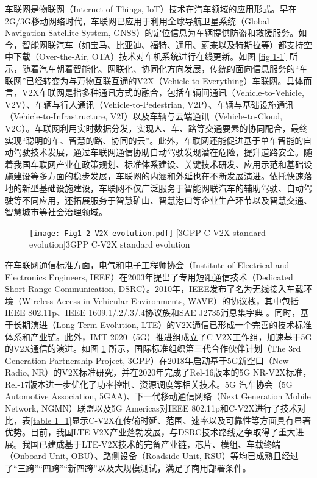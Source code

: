 车联网是物联网（Internet of Things, IoT）技术在汽车领域的应用形式。早在2G/3G移动网络时代，车联网已应用于利用全球导航卫星系统（Global Navigation Satellite System, GNSS）的定位信息为车辆提供防盗和救援服务。如今，智能网联汽车（如宝马、比亚迪、福特、通用、蔚来以及特斯拉等）都支持空中下载（Over-the-Air, OTA）技术对车机系统进行在线更新。如图 \ref{fig 1-1} 所示，随着汽车朝着智能化、网联化、协同化方向发展，传统的面向信息服务的“车联网”已经转变为与万物互联互通的V2X（Vehicle-to-Everything）车联网。具体而言，V2X车联网是指多种通讯方式的融合，包括车辆间通讯（Vehicle-to-Vehicle, V2V）、车辆与行人通讯（Vehicle-to-Pedestrian, V2P）、车辆与基础设施通讯（Vehicle-to-Infrastructure, V2I）以及车辆与云端通讯（Vehicle-to-Cloud, V2C）。车联网利用实时数据分发，实现人、车、路等交通要素的协同配合，最终实现“聪明的车、智慧的路、协同的云”。此外，车联网还能促进基于单车智能的自动驾驶技术发展，通过车联网通信协助自动驾驶发现潜在危险，提升道路安全。随着我国车联网产业在政策规划、标准体系建设、关键技术研发、应用示范和基础设施建设等多方面的稳步发展，车联网的内涵和外延也在不断发展演进。依托快速落地的新型基础设施建设，车联网不仅广泛服务于智能网联汽车的辅助驾驶、自动驾驶等不同应用，还拓展服务于智慧矿山、智慧港口等企业生产环节以及智慧交通、智慧城市等社会治理领域\cite{zhong2021che}。

\begin{figure}[h]
	\centering
\texttt{[image: Fig1-2-V2X-evolution.pdf]}
	[3GPP C-V2X standard evolution]{3GPP C-V2X standard evolution}
	\label{fig 1-2}
\end{figure}

在车联网通信标准方面，电气和电子工程师协会（Institute of Electrical and Electronics Engineers, IEEE）在2003年提出了专用短距通信技术（Dedicated Short-Range Communication, DSRC）。2010年，IEEE发布了名为无线接入车载环境（Wireless Access in Vehicular Environments, WAVE）的协议栈，其中包括IEEE 802.11p、IEEE 1609.1/.2/.3/.4协议族和SAE J2735消息集字典 \cite{wu2013vehicular}。同时，基于长期演进（Long-Term Evolution, LTE）的V2X通信已形成一个完善的技术标准体系和产业链\cite{chen2016lte}。此外，IMT-2020（5G）推进组成立了C-V2X工作组，加速基于5G的V2X通信的演进。如图 \ref{fig 1-2} 所示，国际标准组织第三代合作伙伴计划（The 3rd Generation Partnership Project, 3GPP）在2018年启动基于5G新空口（New Radio, NR）的V2X标准研究，并在2020年完成了Rel-16版本的5G NR-V2X标准\cite{saad2021advancements}，Rel-17版本进一步优化了功率控制、资源调度等相关技术。5G 汽车协会（5G Automotive Association, 5GAA)、下一代移动通信网络（Next Generation Mobile Network, NGMN）联盟以及5G Americas对IEEE 802.11p和C-V2X进行了技术对比，表\ref{table 1_1}显示C-V2X在传输时延、范围、速率以及可靠性等方面具有显著优势。目前，我国LTE-V2X产业蓬勃发展，与DSRC技术路线之争取得了重大进展。我国已建成基于LTE-V2X技术的完备产业链，芯片、模组、车载终端（Onboard Unit, OBU）、路侧设备（Roadside Unit, RSU）等均已成熟且经过了“三跨”“四跨”“新四跨”以及大规模测试，满足了商用部署条件。

